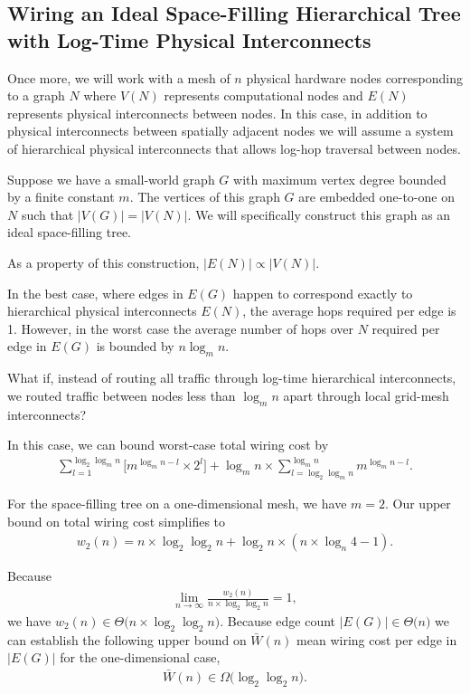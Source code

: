 \subsection{Wiring an Ideal Space-Filling Hierarchical Tree with Log-Time Physical Interconnects}

Once more, we will work with a mesh of $n$ physical hardware nodes corresponding to a graph $N$ where $V(N)$ represents computational nodes and $E(N)$ represents physical interconnects between nodes.
In this case, in addition to physical interconnects between spatially adjacent nodes we will assume a system of hierarchical physical interconnects that allows log-hop traversal between nodes.

Suppose we have a small-world graph $G$ with maximum vertex degree bounded by a finite constant $m$.
The vertices of this graph $G$ are embedded one-to-one on $N$ such that $|V(G)| = |V(N)|$.
We will specifically construct this graph as an ideal space-filling tree.

As a property of this construction, $|E(N)| \propto |V(N)|$.

In the best case, where edges in $E(G)$ happen to correspond exactly to hierarchical physical interconnects $E(N)$, the average hops required per edge is 1.
However, in the worst case the average number of hops over $N$ required per edge in $E(G)$ is bounded by $n \log_m n$.

What if, instead of routing all traffic through log-time hierarchical interconnects, we routed traffic between nodes less than $\log_m n$ apart through local grid-mesh interconnects?

In this case, we can bound worst-case total wiring cost by
\begin{align*}
\sum_{l = 1}^{\log_2 \log_m n} %
\Big[
  m^{\log_m n - l} %
  \times
  2^l %
\Big]
+
\log_m n %
\times
\sum_{l = \log_2 \log_m n }^{ \log_m n} %
m^{\log_m n - l}.
\end{align*}

For the space-filling tree on a one-dimensional mesh, we have $m = 2$.
Our upper bound on total wiring cost simplifies to
\begin{align*}
w_2(n) =
n \times \log_2 \log_2 n
+
\log_2 n \times (n \times \log_n 4 - 1).
\end{align*}

Because
\begin{align*}
\lim_{n \rightarrow \infty}
\frac{
  w_2(n)
}{
  n \times \log_2 \log_2 n
}
= 1,
\end{align*}
we have $w_2(n) \in \Theta \Big( n \times \log_2 \log_2 n \Big)$.
Because edge count $|E(G)| \in \Theta \Big( n \Big)$ we can establish the following upper bound on $\bar{W}(n)$ mean wiring cost per edge in $|E(G)|$ for the one-dimensional case,
\begin{align*}
\bar{W}(n) \in \Omega\Big( \log_2 \log_2 n \Big).
\end{align*}

